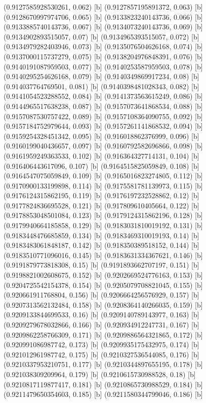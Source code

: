{{{(0.9127585928530261, 0.062) [b] 
(0.9127857195891372, 0.063) [b] 
(0.9128670997974706, 0.065) [b] 
(0.9133823240143736, 0.066) [b] 
(0.9133885740143736, 0.067) [b] 
(0.9134073240143736, 0.069) [b] 
(0.9134902893515057, 0.07) [b] 
(0.9134965393515057, 0.072) [b] 
(0.9134979282403946, 0.073) [b] 
(0.9135076504626168, 0.074) [b] 
(0.9137000115737279, 0.075) [b] 
(0.9138204976848391, 0.076) [b] 
(0.9140191087959503, 0.077) [b] 
(0.9140253587959503, 0.078) [b] 
(0.9140295254626168, 0.079) [b] 
(0.9140349869917234, 0.08) [b] 
(0.914037764769501, 0.081) [b] 
(0.9140398481028343, 0.082) [b] 
(0.9141054523288552, 0.084) [b] 
(0.9141373563615249, 0.086) [b] 
(0.9144965517638238, 0.087) [b] 
(0.9157073641868534, 0.088) [b] 
(0.9157087530757422, 0.089) [b] 
(0.9157108364090755, 0.092) [b] 
(0.9157184752979644, 0.093) [b] 
(0.9157261141868532, 0.094) [b] 
(0.9159254328451342, 0.095) [b] 
(0.916018862376999, 0.096) [b] 
(0.9160199040436657, 0.097) [b] 
(0.9160792582696866, 0.098) [b] 
(0.9161959249363533, 0.102) [b] 
(0.916364327714131, 0.104) [b] 
(0.916406443617096, 0.107) [b] 
(0.9164515825059849, 0.108) [b] 
(0.9164547075059849, 0.109) [b] 
(0.9165016823274805, 0.112) [b] 
(0.9170900133199898, 0.114) [b] 
(0.9175581781139973, 0.115) [b] 
(0.9176124315862195, 0.119) [b] 
(0.9176197232528862, 0.12) [b] 
(0.9177824836695528, 0.121) [b] 
(0.917809610405664, 0.122) [b] 
(0.9178853048501084, 0.123) [b] 
(0.9179124315862196, 0.128) [b] 
(0.9179940664185858, 0.129) [b] 
(0.9183031810019192, 0.131) [b] 
(0.9183448476685859, 0.134) [b] 
(0.9183469310019193, 0.14) [b] 
(0.9183483061848187, 0.142) [b] 
(0.918350389518152, 0.144) [b] 
(0.9183510771096016, 0.145) [b] 
(0.9183631334367621, 0.146) [b] 
(0.9191879773818308, 0.15) [b] 
(0.9191893662707197, 0.151) [b] 
(0.9198821002608675, 0.152) [b] 
(0.9202669524776163, 0.153) [b] 
(0.9204725542154378, 0.154) [b] 
(0.9205079708821045, 0.155) [b] 
(0.920661911768804, 0.156) [b] 
(0.9206664256576929, 0.157) [b] 
(0.9207313562132484, 0.158) [b] 
(0.9208364140266035, 0.159) [b] 
(0.9209133844699533, 0.16) [b] 
(0.9209140789143977, 0.163) [b] 
(0.9209279678032866, 0.166) [b] 
(0.920934912247731, 0.167) [b] 
(0.9209862258766309, 0.171) [b] 
(0.9209886564321865, 0.172) [b] 
(0.920991086987742, 0.173) [b] 
(0.9209935175432975, 0.174) [b] 
(0.921012961987742, 0.175) [b] 
(0.9210327536544085, 0.176) [b] 
(0.9210337953210751, 0.177) [b] 
(0.9210344897655195, 0.178) [b] 
(0.921038309209964, 0.179) [b] 
(0.9210615730988528, 0.18) [b] 
(0.9210817119877417, 0.181) [b] 
(0.9210865730988529, 0.184) [b] 
(0.9211479650354603, 0.185) [b] 
(0.9211580344799046, 0.186) [b] 
}}}
